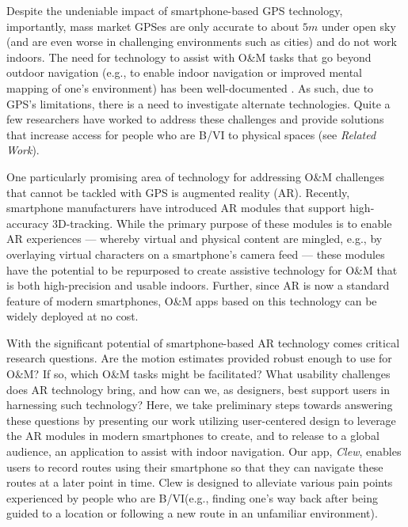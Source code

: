 \documentclass[chi_draft]{sigchi}
\newcommand{\BVI}{B/VI\xspace}
\newcommand{\OM}{O\&M\xspace}
\begin{document}
Despite the undeniable impact of smartphone-based GPS technology, importantly, mass market GPSes are only accurate to about $5m$ under open sky (and are even worse in challenging environments such as cities) and do not work indoors.  The need for technology to assist with \OM tasks that go beyond outdoor navigation (e.g., to enable indoor navigation or improved mental mapping of one's environment) has been well-documented \cite{long1997establishing}.  As such, due to GPS's limitations, there is a need to investigate alternate technologies.  Quite a few researchers have worked to address these challenges and provide solutions that increase access for people who are \BVI to physical spaces (see \emph{Related Work}).

One particularly promising area of technology for addressing \OM challenges that cannot be tackled with GPS is augmented reality (AR).  Recently, smartphone manufacturers have introduced AR modules that support high-accuracy 3D-tracking.  While the primary purpose of these modules is to enable AR experiences --- whereby virtual and physical content are mingled, e.g., by overlaying virtual characters on a smartphone's camera feed --- these modules have the potential to be repurposed to create assistive technology for \OM that is both high-precision and usable indoors.  Further, since AR is now a standard feature of modern smartphones, \OM apps based on this technology can be widely deployed at no cost.

With the significant potential of smartphone-based AR technology comes critical research questions.  Are the motion estimates provided robust enough to use for \OM? If so, which \OM tasks might be facilitated?  What usability challenges does AR technology bring, and how can we, as designers, best support users in harnessing such technology?  Here, we take preliminary steps towards answering these questions by presenting our work utilizing user-centered design to leverage the AR modules in modern smartphones to create, and to release to a global audience, an application to assist with indoor navigation.  Our app, \emph{Clew}, enables users to record routes using their smartphone so that they can navigate these routes at a later point in time.  Clew is designed to alleviate various pain points experienced by people who are \BVI (e.g., finding one's way back after being guided to a location or following a new route in an unfamiliar environment).%
\end{document}
